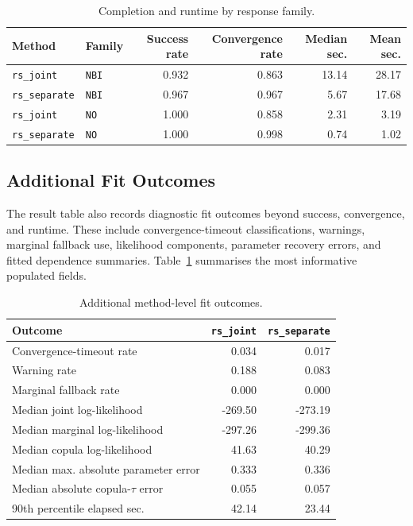 \documentclass[11pt]{article}
\begin{document}
\begin{table}[ht]
\centering
\caption{Completion and runtime by response family.}
\begin{tabular}{llrrrr}
\toprule
Method & Family & Success rate & Convergence rate & Median sec. & Mean sec. \\
\midrule
\texttt{rs\_joint} & \texttt{NBI} & 0.932 & 0.863 & 13.14 & 28.17 \\
\texttt{rs\_separate} & \texttt{NBI} & 0.967 & 0.967 & 5.67 & 17.68 \\
\texttt{rs\_joint} & \texttt{NO} & 1.000 & 0.858 & 2.31 & 3.19 \\
\texttt{rs\_separate} & \texttt{NO} & 1.000 & 0.998 & 0.74 & 1.02 \\
\bottomrule
\end{tabular}
\end{table}

\subsection{Additional Fit Outcomes}

The result table also records diagnostic fit outcomes beyond success,
convergence, and runtime.  These include convergence-timeout classifications,
warnings, marginal fallback use, likelihood components, parameter recovery
errors, and fitted dependence summaries.  Table~\ref{tab:additional-fit}
summarises the most informative populated fields.

\begin{table}[ht]
\centering
\caption{Additional method-level fit outcomes.}
\label{tab:additional-fit}
\begin{tabular}{lrr}
\toprule
Outcome & \texttt{rs\_joint} & \texttt{rs\_separate} \\
\midrule
Convergence-timeout rate & 0.034 & 0.017 \\
Warning rate & 0.188 & 0.083 \\
Marginal fallback rate & 0.000 & 0.000 \\
Median joint log-likelihood & -269.50 & -273.19 \\
Median marginal log-likelihood & -297.26 & -299.36 \\
Median copula log-likelihood & 41.63 & 40.29 \\
Median max. absolute parameter error & 0.333 & 0.336 \\
Median absolute copula-\(\tau\) error & 0.055 & 0.057 \\
90th percentile elapsed sec. & 42.14 & 23.44 \\
\bottomrule
\end{tabular}
\end{table}
\end{document}
